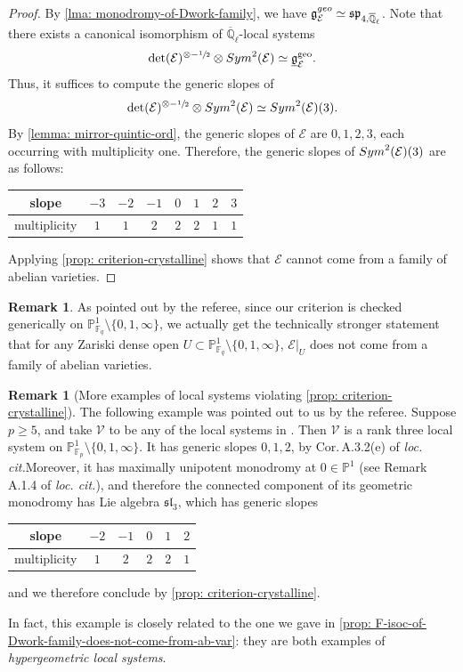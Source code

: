 \documentclass[11pt]{article}
\providecommand{\loccit}{\emph{loc. cit.}}
\numberwithin{equation}{subsection}
\theoremstyle{definition}
\newtheorem{rmk}[thm]{Remark}
\newcommand{\Qlbar}{\overline{\mathbb{Q}}_{\ell}}
\let\mc\mathcal
\let\mb\mathbb
\begin{document}
\begin{proof}
By \cref{lma: monodromy-of-Dwork-family}, we have $\mathfrak{g}^{\rm{geo}}_{\mc{E}}\simeq\mathfrak{sp}_{4,\Qlbar}$. Note that there exists a canonical isomorphism of $\Qlbar$-local systems
\[
\det(\mc{E})^{\otimes-\sfrac{1}{2}}\otimes \rm{Sym}^2(\mc{E})\simeq\underline{\mathfrak{g}}_{\mathcal{E}}^\mathrm{geo}.
\]
Thus, it suffices to compute the generic slopes of
\[
\det(\mc{E})^{\otimes-\sfrac{1}{2}}\otimes \rm{Sym}^2(\mc{E})\simeq\rm{Sym}^2(\mc{E})(3).
\]
By \cref{lemma: mirror-quintic-ord}, the generic slopes of $\mc{E}$ are $0,1,2,3$, each occurring with multiplicity one. Therefore, the generic slopes of $\rm{Sym}^2(\mc{E})(3)$ are as follows:
\begin{center}
\begin{tabular}{ c|c|c|c|c|c|c|c }
slope & $-3$ & $-2$ & $-1$ & $0$ & $1$ & $2$ & $3$\\
\hline
multiplicity & $1$ & $1$ & $2$ & $2$ & $2$ & $1$ & $1$
\end{tabular}
\end{center}
Applying \cref{prop: criterion-crystalline} shows that $\mc{E}$ cannot come from a family of abelian varieties.
\end{proof}

\begin{rmk}
As pointed out by the referee, since our criterion is checked generically on $\mb{P}^1_{\mb{F}_q}\setminus \{0,1,\infty\}$, we actually get the technically stronger statement that for any Zariski dense open $U\subset \mb{P}^1_{\mb{F}_q}\setminus \{0,1, \infty\}$, $\mc{E}|_{U}$ does not come from a family of abelian varieties.
\end{rmk}

\begin{rmk}[More examples of local systems violating \cref{prop: criterion-crystalline}]\label{rmk: more-examples}
The following example was pointed out to us by the referee. Suppose $p\geq 5$, and take $\mc{V}$ to be any of the local systems in \cite[Prop.\,A.2.1]{Drinfeld-Kedlaya-Slopes-of-Indecomposable-F-Isocrystals}. Then $\mc{V}$ is a rank three local system on $\mb{P}^1_{\mb{F}_p}\setminus \{0,1,\infty\}$. It has generic slopes $0,1,2$, by Cor.\,A.3.2(e) of \loccit Moreover, it has maximally unipotent monodromy at $0\in \mb{P}^1$ (see Remark A.1.4 of \loccit), and therefore the connected component of its geometric monodromy has Lie algebra $\mathfrak{sl}_3$, which has generic slopes

\begin{center}
\begin{tabular}{ c|c|c|c|c|c }
slope & $-2$ & $-1$ & $0$ & $1$ & $2$ \\
\hline
multiplicity & $1$ & $2$ & $2$ & $2$ & $1$
\end{tabular}
\end{center}
and we therefore conclude by \cref{prop: criterion-crystalline}.

In fact, this example is closely related to the one we gave in \cref{prop: F-isoc-of-Dwork-family-does-not-come-from-ab-var}: they are both examples of \emph{hypergeometric local systems}.
\end{rmk}
\end{document}
